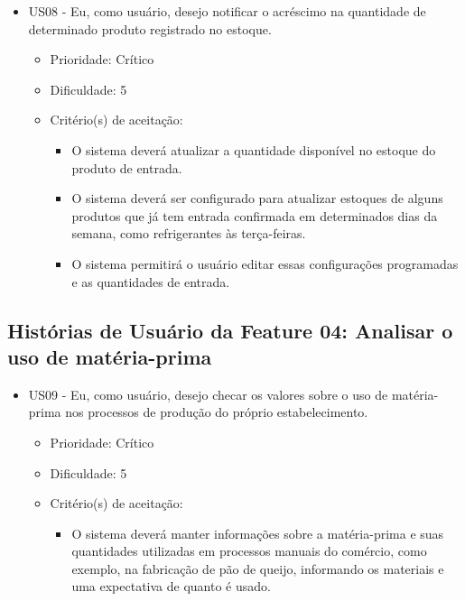 \begin{itemize}

\item US08 - Eu, como usuário, desejo notificar o acréscimo na quantidade de determinado produto registrado no estoque.
    \begin{itemize}
    \item Prioridade: Crítico
    \item Dificuldade: 5
    \item Critério(s) de aceitação:
        \begin{itemize}
        \item O sistema deverá atualizar a quantidade disponível no estoque do produto de entrada.
        \item O sistema deverá ser configurado para atualizar estoques de alguns produtos que já tem entrada confirmada em determinados dias da semana, como refrigerantes às terça-feiras.
        \item O sistema permitirá o usuário editar essas configurações programadas e as quantidades de entrada.
        \end{itemize}
    \end{itemize}

\end{itemize}

\subsection{Histórias de Usuário da Feature 04: Analisar o uso de matéria-prima}

\begin{itemize}

\item US09 - Eu, como usuário, desejo checar os valores sobre o uso de matéria-prima nos processos de produção do próprio estabelecimento.
    \begin{itemize}
    \item Prioridade: Crítico
    \item Dificuldade: 5
    \item Critério(s) de aceitação:
    \begin{itemize}
    \item O sistema deverá manter informações sobre a matéria-prima e suas quantidades utilizadas em processos manuais do comércio, como exemplo, na fabricação de pão de queijo, informando os materiais e uma expectativa de quanto é usado.
    \end{itemize}
    \end{itemize}


\end{itemize}


